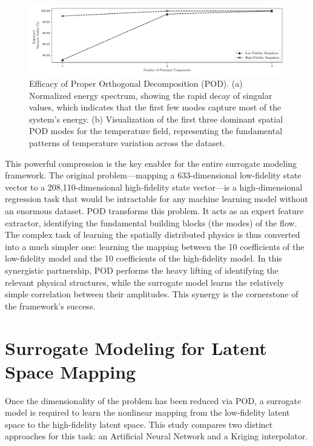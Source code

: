 \documentclass[tg, EN]{ufabcFHZh_tg}
\begin{document}
\begin{figure}[H]
    \centering
    \includegraphics[width=\textwidth]{../latex_src/Figuras/POD_energy.pdf}
    \caption{Efficacy of Proper Orthogonal Decomposition (POD). (a) Normalized energy spectrum, showing the rapid decay of singular values, which indicates that the first few modes capture most of the system's energy. (b) Visualization of the first three dominant spatial POD modes for the temperature field, representing the fundamental patterns of temperature variation across the dataset.}
    \label{fig:pod_results}
\end{figure}

This powerful compression is the key enabler for the entire surrogate modeling framework. The original problem—mapping a 633-dimensional low-fidelity state vector to a 208,110-dimensional high-fidelity state vector—is a high-dimensional regression task that would be intractable for any machine learning model without an enormous dataset. POD transforms this problem. It acts as an expert feature extractor, identifying the fundamental building blocks (the modes) of the flow. The complex task of learning the spatially distributed physics is thus converted into a much simpler one: learning the mapping between the 10 coefficients of the low-fidelity model and the 10 coefficients of the high-fidelity model. In this synergistic partnership, POD performs the heavy lifting of identifying the relevant physical structures, while the surrogate model learns the relatively simple correlation between their amplitudes. This synergy is the cornerstone of the framework's success.

\section{Surrogate Modeling for Latent Space Mapping}

Once the dimensionality of the problem has been reduced via POD, a surrogate model is required to learn the nonlinear mapping from the low-fidelity latent space to the high-fidelity latent space. This study compares two distinct approaches for this task: an Artificial Neural Network and a Kriging interpolator.
\end{document}
